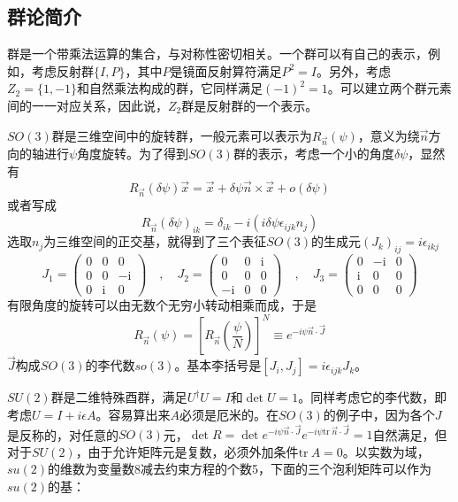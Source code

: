 \documentclass[a4paper,11pt]{ctexart}
\newcommand{\beq}{\begin{equation}}
\newcommand{\eeq}{\end{equation}}
\newcommand{\tr}{\mathrm{tr \ }}
\begin{document}
\subsection{群论简介}
群是一个带乘法运算的集合，与对称性密切相关。一个群可以有自己的表示，例如，考虑反射群$\{ I,P \}$，其中$P$是镜面反射算符满足$P^2 = I$。另外，考虑$Z_2 = \{ 1, -1\}$和自然乘法构成的群，它同样满足$(-1)^2 = 1$。可以建立两个群元素间的一一对应关系，因此说，$Z_2$群是反射群的一个表示。
\par
$SO(3)$群是三维空间中的旋转群，一般元素可以表示为$R_{\vec{n}} (\psi)$，意义为绕$\vec{n}$方向的轴进行$\psi$角度旋转。为了得到$SO(3)$群的表示，考虑一个小的角度$\delta \psi$，显然有
\beq
R_{\vec{n}} (\delta \psi) \vec{x}= \vec{x} + \delta \psi \vec{n} \times \vec{x} + o(\delta \psi)
\eeq
或者写成
\beq
R_{\vec{n}} (\delta \psi)_{ik} = \delta_{ik} -i (i \delta \psi \epsilon_{ijk} n_j )
\eeq
选取$n_j$为三维空间的正交基，就得到了三个表征$SO(3)$的生成元$(J_k)_{ij} = i \epsilon_{ikj}$
\beq
J_{1}=\left(\begin{array}{ccc}{0} & {0} & {0} \\ {0} & {0} & {-\mathrm{i}} \\ {0} & {\mathrm{i}} & {0}\end{array}\right) \quad, \quad J_{2}=\left(\begin{array}{ccc}{0} & {0} & {\mathrm{i}} \\ {0} & {0} & {0} \\ {-\mathrm{i}} & {0} & {0}\end{array}\right) \quad, \quad J_{3}=\left(\begin{array}{ccc}{0} & {-\mathrm{i}} & {0} \\ {\mathrm{i}} & {0} & {0} \\ {0} & {0} & {0}\end{array}\right)
\eeq
有限角度的旋转可以由无数个无穷小转动相乘而成，于是
\beq
R_{\vec{n}} (\psi) = \left[ R_{\vec{n}} \left( \frac{\psi}{N} \right) \right]^N \equiv e^{- i \psi \vec{n} \cdot \vec{J}}
\eeq
$\vec{J}$构成$SO(3)$的李代数$so(3)$。基本李括号是$[J_i,J_j] = i\epsilon_{ijk} J_k$。
\par
$SU(2)$群是二维特殊酉群，满足$U^\dagger U = I$和$\det U = 1$。同样考虑它的李代数，即考虑$U = I + i \epsilon A$。容易算出来$A$必须是厄米的。在$SO(3)$的例子中，因为各个$J$是反称的，对任意的$SO(3)$元，$\det R = \det e^{-i \psi \vec{n} \cdot \vec{J} } e^{-i \psi \tr \vec{n} \cdot \vec{J}} = 1$自然满足，但对于$SU(2)$，由于允许矩阵元是复数，必须外加条件$\tr A = 0$。以实数为域，$su(2)$的维数为变量数8减去约束方程的个数5，下面的三个泡利矩阵可以作为$su(2)$的基：
\end{document}
